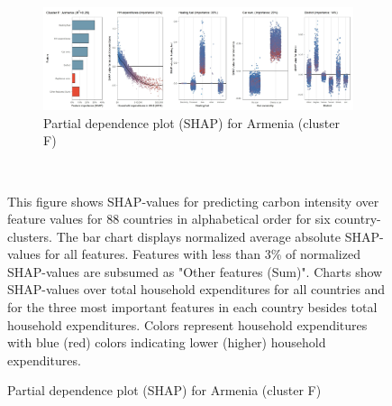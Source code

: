 \begin{figure}[ht!]
    \\
    \vspace{0.5cm}
   \begin{subfigure}[b]{\textwidth}
    \centering
         \caption{Partial dependence plot (SHAP) for Armenia (cluster F)}
         \label{fig:5b_ARM}
         \includegraphics[width=\textwidth]{Figure 5b/Figure_5b_ARM} 
    \end{subfigure}
    \\
    \vspace{0.5cm}
   
    \begin{subcaption2}
     This figure shows SHAP-values for predicting carbon intensity over feature values for 88 countries in alphabetical order for six country-clusters. The bar chart displays normalized average absolute SHAP-values for all features. Features with less than 3\% of normalized SHAP-values are subsumed as "Other features (Sum)". Charts show SHAP-values over total household expenditures for all countries and for the three most important features in each country besides total household expenditures. Colors represent household expenditures with blue (red) colors indicating lower (higher) household expenditures.
     \end{subcaption2}
\end{figure}

